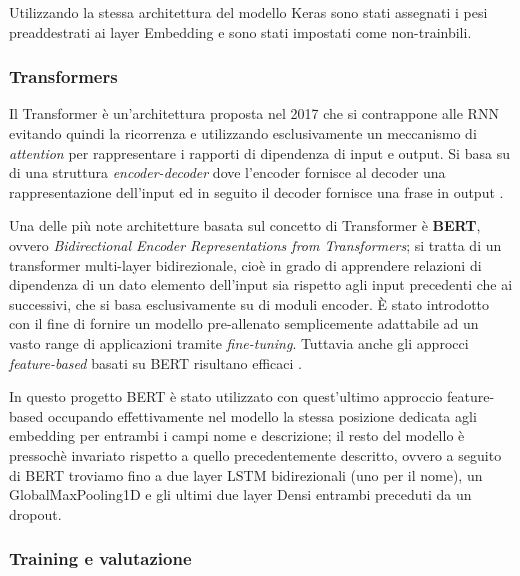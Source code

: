 Utilizzando la stessa architettura del modello Keras sono stati assegnati i pesi
preaddestrati ai layer Embedding e sono stati impostati come non-trainbili.

\subsubsection{Transformers}
Il Transformer è un'architettura proposta nel 2017 che si contrappone alle RNN
evitando quindi la ricorrenza e utilizzando esclusivamente un meccanismo di
\textit{attention} per rappresentare i rapporti di dipendenza di input e output.
Si basa su di una struttura \textit{encoder-decoder} dove l'encoder fornisce al
decoder una rappresentazione dell'input ed in seguito il decoder fornisce una
frase in output \cite{vaswani2017attention}.


Una delle più note architetture basata sul concetto di Transformer è
\textbf{BERT}, ovvero \textit{Bidirectional Encoder Representations from
Transformers}; si tratta di un transformer multi-layer bidirezionale, cioè in
grado di apprendere relazioni di dipendenza di un dato elemento dell'input sia
rispetto agli input precedenti che ai successivi, che si basa esclusivamente su
di moduli encoder. È stato introdotto con il fine di fornire un modello
pre-allenato semplicemente adattabile ad un vasto range di applicazioni tramite
\textit{fine-tuning}. Tuttavia anche gli approcci \textit{feature-based} basati
su BERT risultano efficaci \cite{devlin2018bert}.

In questo progetto BERT è stato utilizzato con quest'ultimo approccio
feature-based occupando effettivamente nel modello la stessa posizione dedicata
agli embedding per entrambi i campi nome e descrizione; il resto del modello è
pressochè invariato rispetto a quello precedentemente descritto, ovvero a
seguito di BERT troviamo fino a due layer LSTM bidirezionali (uno per il nome),
un GlobalMaxPooling1D e gli ultimi due layer Densi entrambi preceduti da un
dropout.

\subsubsection{Training e valutazione}

